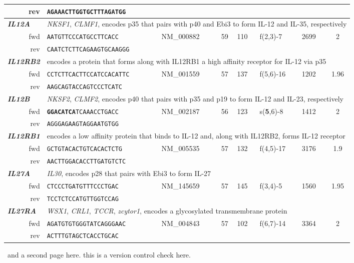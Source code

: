 \documentclass[12pt,a4paper]{scrreprt} %
\begin{document}
\begin{table}[htbp]
{\begin{tabular}{rllclllc}
\ rev & \texttt{AGAAACTTGGTGCTTTAGATGG} &  &  &  &  &  &  \\ 
\hline \multicolumn{1}{l}{\textit{\textbf{IL12A}}} & \multicolumn{7}{l}{\textit{NKSF1}, \textit{CLMF1}, encodes p35 that pairs with p40 and Ebi3 to form IL-12 and IL-35, respectively} \\ 
\ fwd & \texttt{AATGTTCCCATGCCTTCACC} & NM\_000882 & 59 & 110 & f(2,3)-7 & 2699 & 2 \\ 
\ rev & \texttt{CAATCTCTTCAGAAGTGCAAGGG} &  &  &  &  &  &  \\ 
\hline \multicolumn{1}{l}{\textit{\textbf{IL12RB2}}} & \multicolumn{7}{l}{encodes a protein that forms along with IL12RB1 a high affinity receptor for IL-12 via p35} \\ 
\ fwd & \texttt{CCTCTTCACTTCCATCCACATTC} & NM\_001559 & 57 & 137 & f(5,6)-16 & 1202 & 1.96 \\ 
\ rev & \texttt{AAGCAGTACCAGTCCCTCATC} &  &  &  &  &  &  \\ 
\hline \multicolumn{1}{l}{\textit{\textbf{IL12B}}} & \multicolumn{7}{l}{\textit{NKSF2}, \textit{CLMF2}, encodes p40 that pairs with p35 and p19 to form IL-12 and IL-23, respectively} \\ 
\ fwd & \texttt{\textbf{GGACATCA}TCAAACCTGACC} & NM\_002187 & 56 & 123 & s(\textbf{5},6)-8 & 1412 & 2 \\ 
\ rev & \texttt{AGGGAGAAGTAGGAATGTGG} &  &  &  &  &  &  \\ 
\hline \multicolumn{1}{l}{\textit{\textbf{IL12RB1}}} & \multicolumn{7}{l}{encodes a low affinity protein that binds to IL-12 and, along with IL12RB2, forms IL-12 receptor} \\ 
\ fwd & \texttt{GCTGTACACTGTCACACTCTG} & NM\_005535 & 57 & 132 & f(4,5)-17 & 3176 & 1.9 \\ 
\ rev & \texttt{AACTTGGACACCTTGATGTCTC} &  &  &  &  &  &  \\ 
\hline \multicolumn{1}{l}{\textit{\textbf{IL27A}}} & \multicolumn{7}{l}{\textit{IL30}, encodes p28 that pairs with Ebi3 to form IL-27} \\ 
\ fwd & \texttt{CTCCCTGATGTTTCCCTGAC} & NM\_145659 & 57 & 145 & f(3,4)-5 & 1560 & 1.95 \\ 
\ rev & \texttt{TCCTCTCCATGTTGGTCCAG} &  &  &  &  &  &  \\ 
\hline \multicolumn{1}{l}{\textit{\textbf{IL27RA}}} & \multicolumn{7}{l}{\textit{WSX1}, \textit{CRL1}, \textit{TCCR}, \textit{zcytor1}, encodes a glycosylated transmembrane protein} \\ 
\ fwd & \texttt{AGATGTGTGGGTATCAGGGAAC} & NM\_004843 & 57 & 102 & f(6,7)-14 & 3364 & 2 \\ 
\ rev & \texttt{ACTTTGTAGCTCACCTGCAC} &  &  &  &  &  &  \\ 
\bottomrule
\end{tabular} }
\end{table}
\newpage
\ and a second page here. this is a version control check here.
\end{document}

